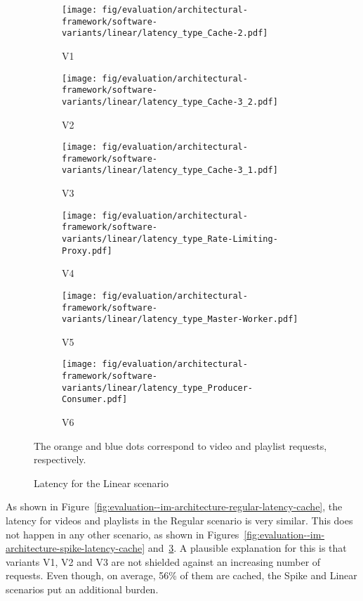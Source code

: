 \begin{figure}[p]
	\centering
	\begin{subfigure}[b]{0.48\textwidth}
		\texttt{[image: fig/evaluation/architectural-framework/software-variants/linear/latency\_type\_Cache-2.pdf]}
		\caption{V1}
		\label{fig:evaluation--im-architecture-linear-latency-cache-1}
	\end{subfigure}
	\begin{subfigure}[b]{0.48\textwidth}
		\texttt{[image: fig/evaluation/architectural-framework/software-variants/linear/latency\_type\_Cache-3\_2.pdf]}
		\caption{V2}
		\label{fig:evaluation--im-architecture-linear-latency-cache-2}
	\end{subfigure}
	\begin{subfigure}[b]{0.48\textwidth}
		\texttt{[image: fig/evaluation/architectural-framework/software-variants/linear/latency\_type\_Cache-3\_1.pdf]}
		\caption{V3}
		\label{fig:evaluation--im-architecture-linear-latency-cache}
	\end{subfigure}
	\begin{subfigure}[b]{0.48\textwidth}
		\texttt{[image: fig/evaluation/architectural-framework/software-variants/linear/latency\_type\_Rate-Limiting-Proxy.pdf]}
		\caption{V4}
		\label{fig:evaluation--im-architecture-linear-latency-rate-limiting-proxy}
	\end{subfigure}
	\begin{subfigure}[b]{0.48\textwidth}
		\texttt{[image: fig/evaluation/architectural-framework/software-variants/linear/latency\_type\_Master-Worker.pdf]}
		\caption{V5}
		\label{fig:evaluation--im-architecture-linear-latency-master-worker}
	\end{subfigure}
	\begin{subfigure}[b]{0.48\textwidth}
		\texttt{[image: fig/evaluation/architectural-framework/software-variants/linear/latency\_type\_Producer-Consumer.pdf]}
		\caption{V6}
		\label{fig:evaluation--im-architecture-linear-latency-producer-consumer}
	\end{subfigure}
	\caption{Latency for the Linear scenario}
	\label{fig:evaluation--im-architecture-linear-latency-by-request-type}
	The orange and blue dots correspond to video and playlist requests, respectively.
\end{figure}

As shown in Figure~\ref{fig:evaluation--im-architecture-regular-latency-cache}, the latency for videos and playlists in the Regular scenario is very similar. This does not happen in any other scenario, as shown in Figures~\ref{fig:evaluation--im-architecture-spike-latency-cache} and~\ref{fig:evaluation--im-architecture-linear-latency-cache}. A plausible explanation for this is that variants V1, V2 and V3 are not shielded against an increasing number of requests. Even though, on average, 56\% of them are cached, the Spike and Linear scenarios put an additional burden.%

